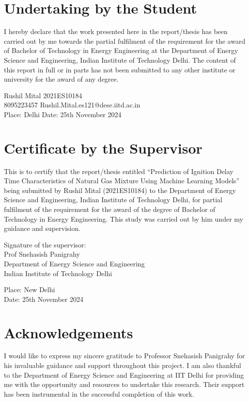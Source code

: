 \documentclass[12pt]{report}
\begin{document}
\newpage

\section*{ \centering Undertaking by the Student}
I hereby declare that the work presented here in the report/thesis has been carried out by me towards the partial fulfilment of the requirement for the award of Bachelor of Technology in Energy Engineering at the Department of Energy Science and Engineering, Indian Institute of Technology Delhi. The content of this report in full or in parts has not been submitted to any other institute or university for the award of any degree.
\vspace{2cm}


Rushil Mital \hfill 2021ES10184 \\
8095223457 \hfill Rushil.Mital.es121@dese.iitd.ac.in \\
Place: Delhi \hfill Date: 25th November 2024

\newpage

\section*{\centering Certificate by the Supervisor}
This is to certify that the report/thesis entitled “Prediction of Ignition Delay Time Characteristics of Natural Gas Mixture Using Machine Learning Models” being submitted by Rushil Mital (2021ES10184) to the Department of Energy Science and Engineering, Indian Institute of Technology Delhi, for partial fulfilment of the requirement for the award of the degree of Bachelor of Technology in Energy Engineering. This study was carried out by him under my guidance and supervision.

\vspace{1cm}

\begin{flushright}
Signature of the supervisor: \\
Prof Snehasish Panigrahy \\
Department of Energy Science and Engineering \\
Indian Institute of Technology Delhi
\end{flushright}

Place: New Delhi \\
Date: 25th November 2024\\



\newpage
\section*{\centering Acknowledgements}
I would like to express my sincere gratitude to Professor Snehasish Panigrahy for his invaluable guidance and support throughout this project. I am also thankful to the Department of Energy Science and Engineering at IIT Delhi for providing me with the opportunity and resources to undertake this research. Their support has been instrumental in the successful completion of this work.
\end{document}
